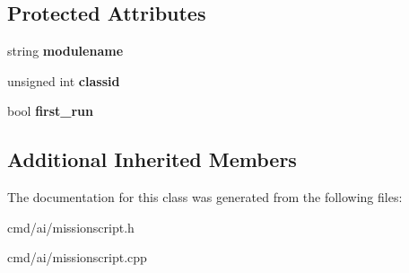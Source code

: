 \subsection*{Protected Attributes}
\begin{DoxyCompactItemize}
\item 
string {\bfseries modulename}\hypertarget{classAImissionScript_a9d5d0ff88130c0b20feea49a1bcf7d8f}{}\label{classAImissionScript_a9d5d0ff88130c0b20feea49a1bcf7d8f}

\item 
unsigned int {\bfseries classid}\hypertarget{classAImissionScript_adde31356f53adefe5667826ab200894c}{}\label{classAImissionScript_adde31356f53adefe5667826ab200894c}

\item 
bool {\bfseries first\+\_\+run}\hypertarget{classAImissionScript_a1ece8156233b39d86c93368021b9684e}{}\label{classAImissionScript_a1ece8156233b39d86c93368021b9684e}

\end{DoxyCompactItemize}
\subsection*{Additional Inherited Members}


The documentation for this class was generated from the following files\+:\begin{DoxyCompactItemize}
\item 
cmd/ai/missionscript.\+h\item 
cmd/ai/missionscript.\+cpp\end{DoxyCompactItemize}
